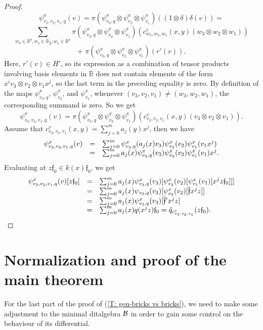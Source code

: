 \documentclass{article}
\theoremstyle{definition}
\renewcommand{\frak}{\mathfrak}
\newcommand{\hueca}[1]{\mathbb{#1}}
\begin{document}
\begin{proof}
\vbox{$$
\psi^x_{v_3,v_2,v_1,q}(v)
=\pi (\psi^x_{v_3,q}\otimes\psi^x_{v_2}\otimes\psi^x_{v_1})((1\otimes\delta)\delta(v))=$$
$$
\sum_{w_3\in \hueca{B}^b,w_2\in \hueca{B}_{\frak{Z}},w_1\in \hueca{B}^a}\pi (\psi^x_{v_3,q}\otimes\psi^x_{v_2}\otimes\psi^x_{v_1})(c^v_{w_3,w_2,w_1}(x,y)(w_3\otimes w_2\otimes w_1))$$
$$+\,\,\pi (\psi^x_{v_3,q}\otimes\psi^x_{v_2}\otimes\psi^x_{v_1})(r'(v)).$$}
Here, $r'(v)\in H'$, so its expression as a combination of  tensor products involving basis elements in $\hueca{B}$ does not contain elements of the form $x^iv_3\otimes v_2\otimes v_1x^j$, so the last term in the preceding equality is zero.  By definition of the maps $\psi^x_{v_3,q}$, $\psi^x_{v_2}$, and $\psi^x_{v_1}$, whenever $(v_3,v_2,v_1)\not=(w_3,w_2,w_1)$, the corresponding summand is zero. So we get
$$
\psi^x_{v_3,v_2,v_1,q}(v)
=\pi (\psi^x_{v_3,q}\otimes\psi^x_{v_2}\otimes\psi^x_{v_1})(c^v_{v_3,v_2,v_1}(x,y)(v_3\otimes v_2\otimes v_1)).$$
Assume that $c_{v_3,v_2,v_1}^v(x,y)=\sum_{j=0}^ma_j(y)x^j$, then we have
$$\begin{matrix}
\psi^x_{v_3,v_2,v_1,q}(v)
&=&\sum_{j=0}^m
\psi^x_{v_3,q}(a_j(x)v_3)\psi^x_{v_2}(v_2)\psi^x_{v_1}(v_1x^j)\hfill\\
&=&
\sum_{j=0}^m
a_j(x)\psi^x_{v_3,q}(v_3)\psi^x_{v_2}(v_2)\psi^x_{v_1}(v_1)x^j.\hfill\\
\end{matrix}$$
Evaluating at $z\frak{f}_0\in k(x)\frak{f}_0$, we get 
$$
\begin{matrix}
\psi^x_{v_3,v_2,v_1,q}(v)[z\frak{f}_0]
&=&
\sum_{j=0}^ma_j(x)\psi^x_{v_3,q}(v_3)[\psi^x_{v_2}(v_2)[\psi_{v_1}^x(v_1)[x^jz\frak{f}_0]]]\hfill\\
&=&
\sum_{j=0}^ma_j(x)\psi_{v_3,q}(v_3)[\psi^x_{v_2}(v_2)[\hat{\frak{f}}x^jz]]\hfill\\
&=&
\sum_{j=0}^ma_j(x)\psi^x_{v_3,q}(v_3)[\hat{\frak{f}}'x^jz]\hfill\\
&=&
\sum_{j=0}^ma_j(x)q(x^jz)\frak{f}_0=\hat{q}_{c_{v_3,v_2,v_1}^v}(z\frak{f}_0).\hfill
\end{matrix}$$
\end{proof}

\section{Normalization and proof of the  main theorem}

For the last part of  the proof of (\ref{T: gen-bricks vs bricks}), we need to make some adjustment to the minimal ditalgebra ${\cal B}$ in order to gain some control on the behaviour of its differential. 
 
\end{document}
